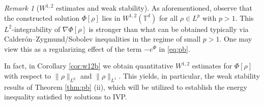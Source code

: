 \documentclass[11pt,reqno,a4paper]{amsart}
\theoremstyle{definition}
\theoremstyle{remark}
\newtheorem{remark}[lemma]{Remark}
\numberwithin{equation}{section}
\newcommand{\T} {\mathbb T}
\begin{document}
\begin{remark}[$W^{1,2}$ estimates and weak stability]%

As aforementioned, observe that the constructed solution $\Phi[\rho]$ lies in $W^{1,2}(\T^d)$ for all $\rho \in L^p$ with $p>1$. This $L^2$-integrability of $\nabla \Phi[\rho]$ is stronger than what can be obtained typically via Calder\'on--Zygmund/Sobolev inequalities in the regime of small $p>1$. One may view this as a regularizing effect of the term $-e^\Phi$ in \eqref{eq:pb}.

In fact, in Corollary \ref{cor:w12b} we obtain quantitative $W^{1,2}$ estimates for $\Phi[\rho]$ with respect to  $\|\rho\|_{L^p}$ and  $\|\rho\|_{L^1}$. This yields, in particular, the weak stability results of Theorem \ref{thm:pb} (ii), which will be utilized to establish the energy inequality satisfied by solutions to IVP.
\end{remark}
\end{document}
